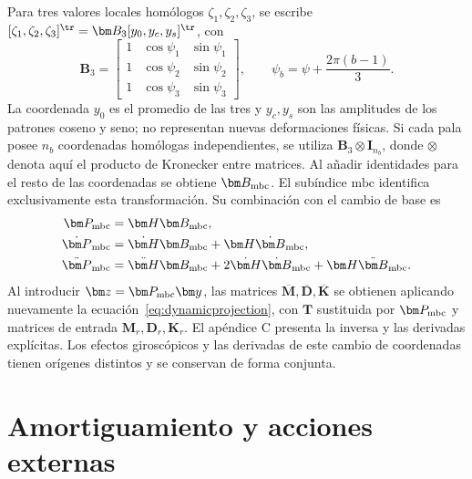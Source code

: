 Para tres valores locales homólogos $\zeta_1,\zeta_2,\zeta_3$, se escribe $[\zeta_1,\zeta_2,\zeta_3]^\tr=\bm B_3[y_0,y_c,y_s]^\tr$, con
\begin{equation}
\bm B_3=\begin{bmatrix}
1&\cos\psi_1&\sin\psi_1\\
1&\cos\psi_2&\sin\psi_2\\
1&\cos\psi_3&\sin\psi_3
\end{bmatrix},\qquad
\psi_b=\psi+\frac{2\pi(b-1)}3.
\end{equation}
La coordenada $y_0$ es el promedio de las tres y $y_c,y_s$ son las amplitudes de los patrones coseno y seno; no representan nuevas deformaciones físicas. Si cada pala posee $n_b$ coordenadas homólogas independientes, se utiliza $\bm B_3\otimes\bm I_{n_b}$, donde $\otimes$ denota aquí el producto de Kronecker entre matrices. Al añadir identidades para el resto de las coordenadas se obtiene $\bm B_{\rm mbc}$. El subíndice $\mathrm{mbc}$ identifica exclusivamente esta transformación. Su combinación con el cambio de base es
\begin{align}
\bm P_{\rm mbc}&=\bm H\bm B_{\rm mbc},\nonumber\\
\dot{\bm P}_{\rm mbc}&=\dot{\bm H}\bm B_{\rm mbc}+\bm H\dot{\bm B}_{\rm mbc},\nonumber\\
\ddot{\bm P}_{\rm mbc}&=\ddot{\bm H}\bm B_{\rm mbc}
+2\dot{\bm H}\dot{\bm B}_{\rm mbc}+\bm H\ddot{\bm B}_{\rm mbc}.
\end{align}
Al introducir $\bm z=\bm P_{\rm mbc}\bm y$, las matrices $\overline{\bm M},\overline{\bm D},\overline{\bm K}$ se obtienen aplicando nuevamente la ecuación~\eqref{eq:dynamicprojection}, con $\bm T$ sustituida por $\bm P_{\rm mbc}$ y matrices de entrada $\bm M_r,\bm D_r,\bm K_r$. El apéndice C presenta la inversa y las derivadas explícitas. Los efectos giroscópicos y las derivadas de este cambio de coordenadas tienen orígenes distintos y se conservan de forma conjunta.

\FloatBarrier
\section{Amortiguamiento y acciones externas}
